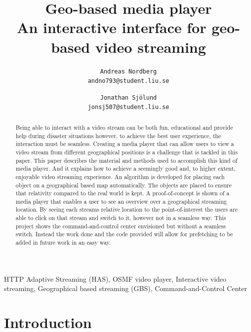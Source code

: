 \documentclass[9pt,a4paper]{acmproc}
\author{
\texttt{Andreas Nordberg}\\
\texttt{andno793@student.liu.se}
  \and
  \texttt{Jonathan Sjölund}\\
  \texttt{jonsj507@student.liu.se}
}
\begin{document}
\title{%
	Geo-based media player \\
	\large An interactive interface for geo-based video streaming}
\maketitle



\begin{abstract}
Being able to interact with a video stream can be both fun, educational and provide help during disaster situations however, to achieve the best user experience, the interaction must be seamless. Creating a media player that can allow users to view a video stream from different geographical positions is a challenge that is tackled in this paper. This paper describes the material and methods used to accomplish this kind of media player. And it explains how to achieve a seemingly good and, to higher extent, enjoyable video streaming experience. An algorithm is developed for placing each object on a geographical based map automatically. The objects are placed to ensure that relativity compared to the real world is kept. A proof-of-concept is shown of a media player that enables a user to see an overview over a geographical streaming location. By seeing each streams relative location to the point-of-interest the users are able to click on that stream and switch to it, however not in a seamless way. This project shows the command-and-control center envisioned but without a seamless switch. Instead the work done and the code provided will allow for prefetching to be added in future work in an easy way.

\end{abstract}

\begin{keywords}
HTTP Adaptive Streaming (HAS), OSMF video player, Interactive video streaming, Geographical based streaming (GBS), Command-and-Control Center
\end{keywords}

\section{Introduction} 
\end{document}
